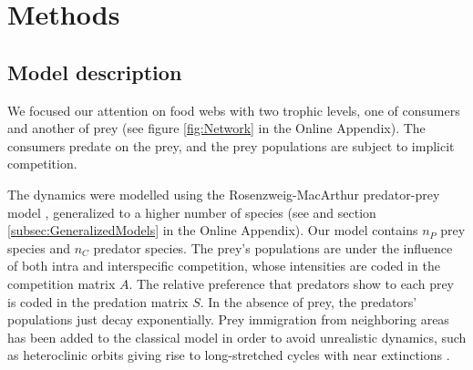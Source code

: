 \section{Methods}
\label{sec:Methods}

\subsection{Model description}
\label{subsec:Model}

We focused our attention on food webs with two trophic levels, one of consumers and another of prey (see figure \ref{fig:Network} in the Online Appendix). The consumers predate on the prey, and the prey populations are subject to implicit competition.

The dynamics were modelled using the Rosenzweig-MacArthur predator-prey model \citep{Rosenzweig1963}, generalized to a higher number of species (see \citet{Scheffer2004} and section \ref{subsec:GeneralizedModels} in the Online Appendix). Our model contains $n_P$ prey species and $n_C$ predator species. The prey's populations are under the influence of both intra and interspecific competition, whose intensities are coded in the competition matrix $A$. The relative preference that predators show to each prey is coded in the predation matrix $S$. In the absence of prey, the predators' populations just decay exponentially. Prey immigration from neighboring areas has been added to the classical model in order to avoid unrealistic dynamics, such as heteroclinic orbits giving rise to long-stretched cycles with near extinctions \citep{Scheffer2004}.

